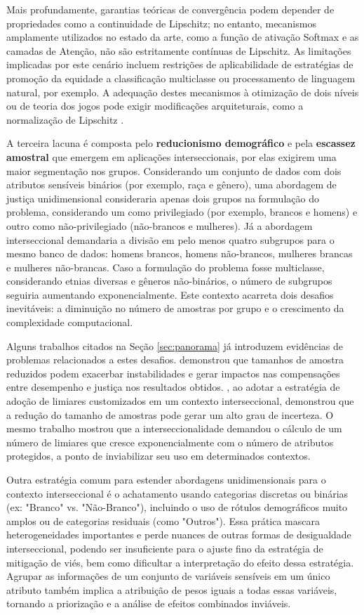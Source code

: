 Mais profundamente, garantias teóricas de convergência podem depender de propriedades como a continuidade de Lipschitz; no entanto, mecanismos amplamente utilizados no estado da arte, como a função de ativação Softmax e as camadas de Atenção, não são estritamente contínuas de Lipschitz. As limitações implicadas por este cenário incluem restrições de aplicabilidade de estratégias de promoção da equidade a classificação multiclasse ou processamento de linguagem natural, por exemplo. A adequação destes mecanismos à otimização de dois níveis ou de teoria dos jogos pode exigir modificações arquiteturais, como a normalização de Lipschitz \cite{yazdani2024fair}.

A terceira lacuna é composta pelo \textbf{reducionismo demográfico} e pela \textbf{escassez amostral} que emergem em aplicações interseccionais, por elas exigirem uma maior segmentação nos grupos. Considerando um conjunto de dados com dois atributos sensíveis binários (por exemplo, raça e gênero), uma abordagem de justiça unidimensional consideraria apenas dois grupos na formulação do problema, considerando um como privilegiado (por exemplo, brancos e homens) e outro como não-privilegiado (não-brancos e mulheres). Já a abordagem interseccional demandaria a divisão em pelo menos quatro subgrupos para o mesmo banco de dados: homens brancos, homens não-brancos, mulheres brancas e mulheres não-brancas. Caso a formulação do problema fosse multiclasse, considerando etnias diversas e gêneros não-binários, o número de subgrupos seguiria aumentando exponencialmente. Este contexto acarreta dois desafios inevitáveis: a diminuição no número de amostras por grupo e o crescimento da complexidade computacional.

Alguns trabalhos citados na Seção \ref{sec:panorama} já introduzem evidências de problemas relacionados a estes desafios. \citet{amir2021impact} demonstrou que tamanhos de amostra reduzidos podem exacerbar instabilidades e gerar impactos nas compensações entre desempenho e justiça nos resultados obtidos. \citet{seyyed2021underdiagnosis}, ao adotar a estratégia de adoção de limiares customizados em um contexto interseccional, demonstrou que a  redução do tamanho de amostras pode gerar um alto grau de incerteza. O mesmo trabalho mostrou que a interseccionalidade demandou o cálculo de um número de limiares que cresce exponencialmente com o número de atributos protegidos, a ponto de  inviabilizar seu uso em determinados contextos.

Outra estratégia comum para estender abordagens unidimensionais para o contexto interseccional é o achatamento usando categorias discretas ou binárias (ex: "Branco" vs. "Não-Branco"), incluindo o uso de rótulos demográficos muito amplos ou de categorias residuais (como "Outros"). Essa prática mascara heterogeneidades importantes e perde nuances de outras formas de desigualdade interseccional, podendo ser insuficiente para o ajuste fino da estratégia de mitigação de viés, bem como dificultar a interpretação do efeito dessa estratégia. Agrupar as informações de um conjunto de variáveis sensíveis em um único atributo também implica a atribuição de pesos iguais a todas essas variáveis, tornando a priorização e a análise de efeitos combinados inviáveis.

